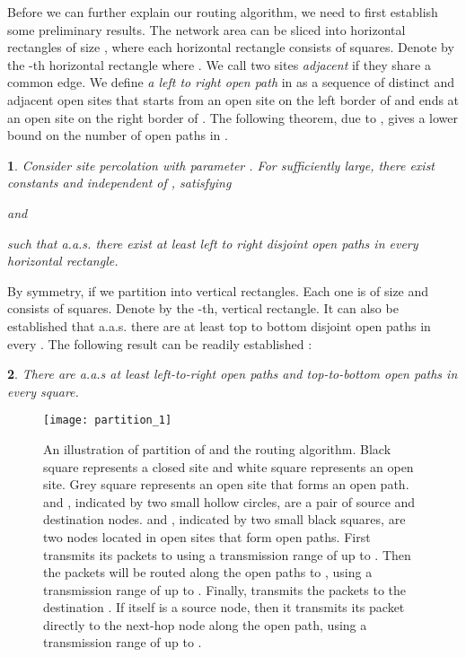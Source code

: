 \documentclass[english]{IEEEtran}
\theoremstyle{plain}
\newtheorem{thm}{\protect\theoremname}
\theoremstyle{plain}
\newtheorem{cor}[thm]{\protect\corollaryname}
\theoremstyle{plain}
\theoremstyle{remark}
\providecommand{\corollaryname}{Corollary}
\providecommand{\theoremname}{Theorem}
\begin{document}
Before we can further explain our routing algorithm, we need to first
establish some preliminary results. The network area  can
be sliced into horizontal rectangles of size ,
where each horizontal rectangle consists of 
squares. Denote by  the -th horizontal rectangle where
. We call two sites \emph{adjacent}
if they share a common edge. We define \emph{a left to right open
path }in  as a sequence of distinct and adjacent open sites
that starts from an open site on the left border of  and ends
at an open site on the right border of . The following theorem,
due to \cite[Theorem 4.3.9]{Franceschetti07Random}, gives a lower
bound on the number of open paths in .
\begin{thm}
\cite[Theorem 4.3.9]{Franceschetti07Random}\label{lem:number of open paths}Consider
site percolation with parameter . For  sufficiently
large, there exist constants  and  independent
of , satisfying 

 

 and 

such that a.a.s. there exist at least  left to
right disjoint open paths in every horizontal rectangle. 
\end{thm}
By symmetry, if we partition  into 
vertical rectangles. Each one is of size 
and consists of  squares. Denote by
 the -th,  vertical
rectangle. It can also be established that a.a.s. there are at least
 top to bottom disjoint open paths in every .
The following result can be readily established \cite{Franceschetti07Closing}:
\begin{cor}
\label{cor:number of vertical and horizontal paths}There are a.a.s
at least  left-to-right open paths and 
top-to-bottom open paths in every square.
\end{cor}
\begin{figure}
\begin{centering}
\texttt{[image: partition\_1]}
\par\end{centering}

\protect\caption{\label{fig:partition}An illustration of partition of  and
the routing algorithm. Black square represents a closed site and white
square represents an open site. Grey square represents an open site
that forms an open path.  and , indicated by two small hollow
circles, are a pair of source and destination nodes.  and
, indicated by two small black squares, are two nodes located
in open sites that form open paths. First  transmits its packets
to  using a transmission range of up to .
Then the packets will be routed along the open paths to ,
using a transmission range of up to . Finally, 
transmits the packets to the destination . If  itself
is a source node, then it transmits its packet directly to the next-hop
node along the open path, using a transmission range of up to . }
\end{figure}
\end{document}

